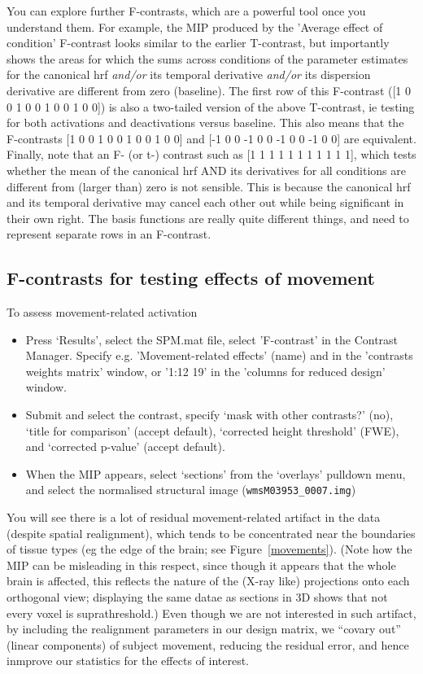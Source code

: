 \documentclass[a4paper,titlepage]{book}
\newcommand{\bi}{\begin{itemize}}
\newcommand{\ei}{\end{itemize}}
\begin{document}
You can explore further F-contrasts, which are a powerful tool once you understand them. For example, the MIP produced by the 'Average effect of condition' F-contrast looks similar to the earlier T-contrast, but importantly shows the areas for which the sums across conditions of the parameter estimates for the canonical hrf {\em and/or} its temporal derivative {\em and/or} its dispersion derivative are different from zero (baseline). The first row of this F-contrast ([1 0 0 1 0 0 1 0 0 1 0 0]) is also a two-tailed version of the above T-contrast, ie testing for both activations and deactivations versus baseline. This also means that the F-contrasts [1 0 0 1 0 0 1 0 0 1 0 0] and [-1 0 0 -1 0 0 -1 0 0 -1 0 0] are equivalent. Finally, note that an F- (or t-) contrast such as [1 1 1 1 1 1 1 1 1 1 1], which tests whether the mean of the canonical hrf AND its derivatives for all conditions are different from (larger than) zero is not sensible. This is because the canonical hrf and its temporal derivative may cancel each other out while being significant in their own right. The basis functions are really quite different things, and need to represent separate rows in an F-contrast. 


\subsection{F-contrasts for testing effects of movement}

To assess movement-related activation
\bi
\item{Press `Results', select the SPM.mat file, select 'F-contrast' in the Contrast Manager. Specify e.g. 'Movement-related effects' (name) and 
in the 'contrasts weights matrix' window, or '1:12 19' in the 'columns for reduced design' window.} 
\item{
Submit and select the contrast, specify `mask with other contrasts?' (no), `title for comparison' (accept default), `corrected height threshold' (FWE), and `corrected p-value' (accept default).}
 \item{When the MIP appears, select `sections' from the `overlays' pulldown
 menu, and select the normalised structural image (\verb!wmsM03953_0007.img!)}
 \ei

You will see there is a lot of residual movement-related artifact in the data (despite spatial realignment), which tends to be concentrated near the boundaries of tissue types (eg the edge of the brain; see Figure~\ref{movements}). (Note how the MIP can be misleading in this respect, since though it appears that the whole brain is affected, this reflects the nature of the (X-ray like) projections onto each orthogonal view; displaying the same datae as sections in 3D shows that not every voxel is suprathreshold.)  Even though we are not interested in such artifact, by including the realignment parameters in our design matrix, we ``covary out'' (linear components) of subject movement, reducing the residual error, and hence inmprove our statistics for the effects of interest.
\end{document}
